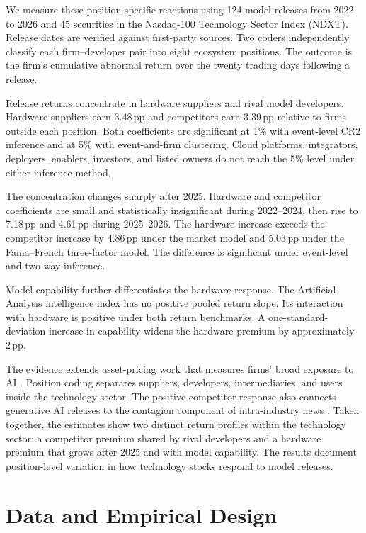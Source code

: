 \documentclass[review,12pt,authoryear]{elsarticle}
\newcommand{\pp}{\,pp}
\begin{document}
We measure these position-specific reactions using 124 model releases from
2022 to 2026 and 45 securities in the Nasdaq-100 Technology Sector Index
(NDXT). Release dates are verified against first-party sources. Two coders
independently classify each firm--developer pair into eight ecosystem
positions. The outcome is the firm's cumulative abnormal return over the
twenty trading days following a release.

Release returns concentrate in hardware suppliers and rival model
developers. Hardware suppliers earn 3.48\pp{} and competitors earn
3.39\pp{} relative to firms outside each position. Both coefficients are
significant at 1\% with event-level CR2 inference and at 5\% with
event-and-firm clustering. Cloud platforms, integrators, deployers,
enablers, investors, and listed owners do not reach the 5\% level under
either inference method.

The concentration changes sharply after 2025. Hardware and competitor
coefficients are small and statistically insignificant during 2022--2024,
then rise to 7.18\pp{} and 4.61\pp{} during 2025--2026. The hardware
increase exceeds the competitor increase by 4.86\pp{} under the market
model and 5.03\pp{} under the Fama--French three-factor model. The
difference is significant under event-level and two-way inference.

Model capability further differentiates the hardware response. The
Artificial Analysis intelligence index has no positive pooled return slope.
Its interaction with hardware is positive under both return benchmarks. A
one-standard-deviation increase in capability widens the hardware premium
by approximately 2\pp{}.

The evidence extends asset-pricing work that measures firms' broad exposure
to AI \citep{eisfeldt2023,babina2024}. Position coding separates suppliers,
developers, intermediaries, and users inside the technology sector. The
positive competitor response also connects generative AI releases to the
contagion component of intra-industry news
\citep{lang1992,chen2005}. Taken together, the estimates show two distinct
return profiles within the technology sector: a competitor premium shared
by rival developers and a hardware premium that grows after 2025 and with
model capability. The results document position-level variation in how
technology stocks respond to model releases.

\section{Data and Empirical Design}\label{sec:data}
\end{document}
